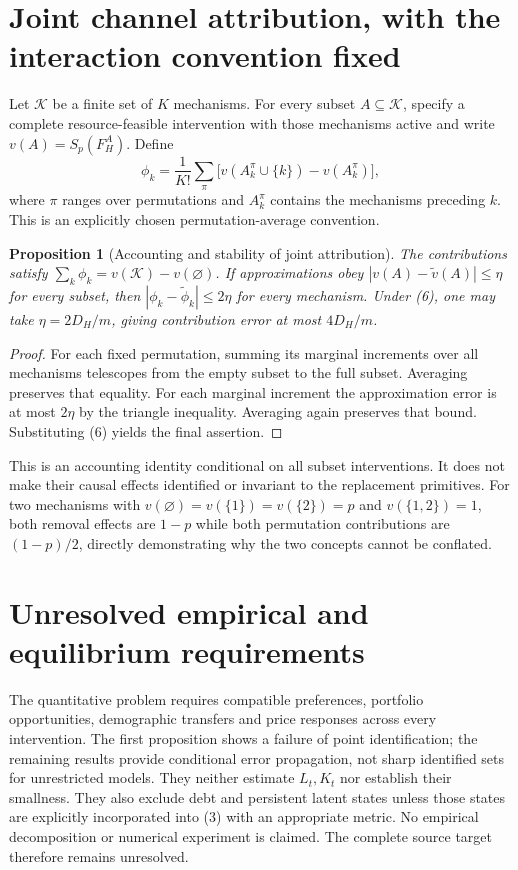 \documentclass[11pt]{article}
\newtheorem{proposition}[theorem]{Proposition}
\theoremstyle{remark}
\begin{document}
\section{Joint channel attribution, with the interaction convention fixed}
Let $\mathcal K$ be a finite set of $K$ mechanisms. For every subset
$A\subseteq\mathcal K$, specify a complete resource-feasible intervention
with those mechanisms active and write $v(A)=S_p(F_H^A)$. Define
\[
 \phi_k=\frac1{K!}\sum_{\pi}
 \bigl[v(A_k^\pi\cup\{k\})-v(A_k^\pi)\bigr], \tag{7}
\]
where $\pi$ ranges over permutations and $A_k^\pi$ contains the mechanisms
preceding $k$. This is an explicitly chosen permutation-average convention.
\begin{proposition}[Accounting and stability of joint attribution]
The contributions satisfy
$\sum_k\phi_k=v(\mathcal K)-v(\varnothing)$.
If approximations obey $|v(A)-\widetilde v(A)|\leq\eta$ for every subset,
then $|\phi_k-\widetilde\phi_k|\leq2\eta$ for every mechanism. Under
(6), one may take $\eta=2D_H/m$, giving contribution error at most
$4D_H/m$.
\end{proposition}
\begin{proof}
For each fixed permutation, summing its marginal increments over all
mechanisms telescopes from the empty subset to the full subset. Averaging
preserves that equality. For each marginal increment the approximation
error is at most $2\eta$ by the triangle inequality. Averaging again
preserves that bound. Substituting (6) yields the final assertion.
\end{proof}
This is an accounting identity conditional on all subset interventions.
It does not make their causal effects identified or invariant to the
replacement primitives. For two mechanisms with
$v(\varnothing)=v(\{1\})=v(\{2\})=p$ and $v(\{1,2\})=1$,
both removal effects are $1-p$ while both permutation contributions are
$(1-p)/2$, directly demonstrating why the two concepts cannot be conflated.

\section{Unresolved empirical and equilibrium requirements}
The quantitative problem requires compatible preferences, portfolio
opportunities, demographic transfers and price responses across every
intervention. The first proposition shows a failure of point identification;
the remaining results provide conditional error propagation, not sharp
identified sets for unrestricted models. They neither estimate $L_t,K_t$
nor establish their smallness. They also exclude debt and persistent latent
states unless those states are explicitly incorporated into (3) with an
appropriate metric. No empirical decomposition or numerical experiment is
claimed. The complete source target therefore remains unresolved.
\end{document}

